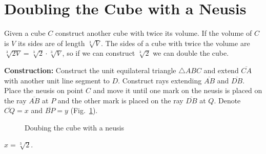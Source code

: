 \section{Doubling the Cube with a Neusis}\label{s.neusis-doubling}

Given a cube $C$ construct another cube with twice its volume. If the volume of $C$ is $V$ its sides are of length $\sqrt[3]{V}$. The sides of a cube with twice the volume are $\sqrt[3]{2 V}=\sqrt[3]{2}\cdot\sqrt[3]{V}$, so if we can construct $\sqrt[3]{2}$ we can double the cube.

\smallskip

\noindent\textbf{Construction:}
Construct the unit equilateral triangle $\triangle ABC$ and extend $\overline{CA}$ with another unit line segment to $D$. Construct rays extending $\overline{AB}$ and $\overline{DB}$. Place the neusis on point $C$ and move it until one mark on the neusis is placed on the ray $\overline{AB}$ at $P$ and the other mark is placed on the ray $\overline{DB}$ at $Q$. Denote $\overline{CQ}=x$ and $\overline{BP}=y$ (Fig.~\ref{f.double-neusis}).

\begin{figure}[b]
\begin{center}
\end{center}
\caption{Doubing the cube with a neusis}\label{f.double-neusis}
\end{figure}

\begin{theorem}
$x=\sqrt[3]{2}$.
\end{theorem}

